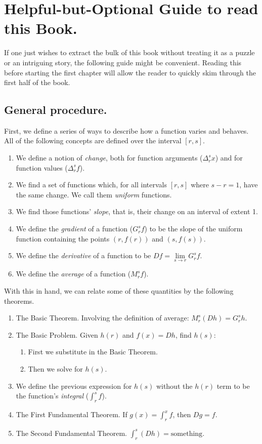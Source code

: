 \section{Helpful-but-Optional Guide to read this Book.}

If one just wishes to extract the bulk of this book without treating it as a puzzle or an intriguing story, the following guide might be convenient. Reading this before starting the first chapter will allow the reader to quickly skim through the first half of the book.

\subsection{General procedure.}

First, we define a series of ways to describe how a function varies and behaves. All of the following concepts are defined over the interval $[r, s]$.

\begin{enumerate}
	\item We define a notion of \textit{change}, both for function arguments ($\Delta_r^s x$) and for function values ($\Delta_r^s f$).
	\item We find a set of functions which, for all intervals $[r, s]$ where $s - r = 1$, have the same change. We call them \textit{uniform} functions.
	\item We find those functions' \textit{slope}, that is, their change on an interval of extent 1.
	\item We define the \textit{gradient} of a function ($G_r^s f$) to be the slope of the uniform function containing the points $(r, f(r))$ and $(s, f(s))$.
	\item We define the \textit{derivative} of a function to be $Df = \lim\limits_{s \to r} G_r^s f$.
	\item We define the \textit{average} of a function ($M_r^s f$).
\end{enumerate}

With this in hand, we can relate some of these quantities by the following theorems.

\begin{enumerate}
	\item The Basic Theorem. Involving the definition of average: $M_r^s (Dh) = G_r^s h$.
	\item The Basic Problem. Given $h(r)$ and $f(x) = Dh$, find $h(s)$:
		\begin{enumerate}
			\item First we substitute in the Basic Theorem.
			\item Then we solve for $h(s)$.
		\end{enumerate}
	\item We define the previous expression for $h(s)$ without the $h(r)$ term to be the function's \textit{integral} ($\int_r^s f$).
	\item The First Fundamental Theorem. If $g(x) = \int_r^x f$, then $Dg = f$.
	\item The Second Fundamental Theorem. $\int_r^s (Dh) = \textrm{something}$.
\end{enumerate}

